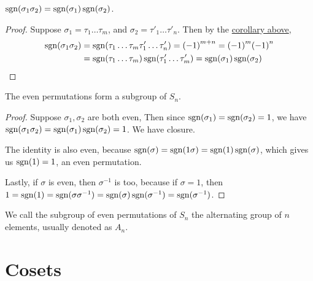 \begin{theorem}\label{thm:sgn-mult}
    \(\operatorname{sgn}(\sigma_1\sigma_2) = \operatorname{sgn}(\sigma_1)\operatorname{sgn}(\sigma_2)\).
\end{theorem}
\begin{proof}
    Suppose \(\sigma_1 = \tau_1\hdots\tau_m\),
    and \(\sigma_2 = \tau'_1\hdots\tau'_n\).
    Then by the \hyperref[cor:sgn-transposition]{corollary above},
    \begin{align*}
        \operatorname{sgn}(\sigma_1\sigma_2)
        &= \operatorname{sgn}(\tau_1\hdots\tau_m\tau'_1\hdots\tau'_n)
        = {(-1)}^{m+n}
        = {(-1)}^m{(-1)}^n \\
        &= \operatorname{sgn}(\tau_1\hdots\tau_m)\operatorname{sgn}(\tau'_1\hdots\tau'_m)
        = \operatorname{sgn}(\sigma_1)\operatorname{sgn}(\sigma_2)
    \end{align*}
\end{proof}
\begin{corollary}
    The even permutations form a subgroup of \(S_n\).
\end{corollary}
\begin{proof}
    Suppose \(\sigma_1,\sigma_2\) are both even,
    Then since \(\operatorname{sgn}(\sigma_1) = \operatorname{sgn}(\sigma_2) = 1\),
    we have \(\operatorname{sgn}(\sigma_1\sigma_2) = \operatorname{sgn}(\sigma_1)\operatorname{sgn}(\sigma_2) = 1\).
    We have closure.

    The identity is also even,
    because \(\operatorname{sgn}(\sigma) = \operatorname{sgn}(1\sigma) = \operatorname{sgn}(1)\operatorname{sgn}(\sigma)\),
    which gives us \(\operatorname{sgn}(1) = 1\), an even permutation.

    Lastly, if \(\sigma\) is even,
    then \(\sigma^{-1}\) is too,
    because if \(\sigma = 1\),
    then \(1 = \operatorname{sgn}(1) = \operatorname{sgn}(\sigma\sigma^{-1})
    = \operatorname{sgn}(\sigma)\operatorname{sgn}(\sigma^{-1}) = \operatorname{sgn}(\sigma^{-1})\).
\end{proof}
\begin{definition}
    We call the subgroup of even permutations of \(S_n\)
    the alternating group of \(n\) elements,
    usually denoted as \(A_n\).
\end{definition}


\section{Cosets}\label{sec:cosets}


